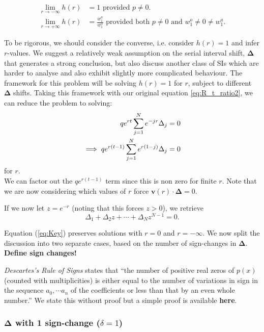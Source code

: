 \documentclass[10pt,journal,compsoc]{IEEEtran}
\begin{document}
\begin{align*}
    \lim_{r \rightarrow -\infty}h(r)&=1 \text{ provided }p \neq 0.\\
    \lim_{r \rightarrow +\infty}h(r)&=\frac{w_1^a}{w_1^o} \text{ provided both }p \neq 0 \text{ and }w_1^o \neq 0 \neq w_1^a.
\end{align*}

To be rigorous, we should consider the converse, i.e. consider $h(r) = 1$ and infer $r$-values. We suggest a relatively weak assumption on the serial interval shift, $\boldsymbol{\Delta}$ that generates a strong conclusion, but also discuss another class of SIs which are harder to analyse and also exhibit slightly more complicated behaviour. The framework for this problem will be solving $h(r) = 1$ for $r$, subject to different $\boldsymbol{\Delta}$ shifts. Taking this framework with our original equation \ref{eq:R_t_ratio2}, we can reduce the problem to solving: 
\begin{align}
   qe^{rt}\sum_{j=1}^{N} e^{-jr}\Delta_j &= 0 \notag \\
   \implies qe^{r(t-1)}\sum_{j=1}^{N} e^{r(1-j)}\Delta_j &= 0 \label{eq:Key}
\end{align}
for $r$.\\
We can factor out the $qe^{r(t-1)}$ term since this is non zero for finite $r$. Note that we are now considering which values of $r$ force $\boldsymbol{v}(r) \cdot \boldsymbol{\Delta}=0$.

If we now let $z = e^{-r}$ (noting that this forces $z>0$), we retrieve
\begin{equation}\label{eq:Poly}
    \Delta_1 +\Delta_2 z + \cdots +\Delta_{N}z^{N-1} = 0.
\end{equation}



Equation (\ref{eq:Key}) preserves solutions with $r=0$ and $r=-\infty$. We now split the discussion into two separate cases, based on the number of sign-changes in $\boldsymbol{\Delta}$. \textbf{Define sign changes!}

\textit{Descartes's Rule of Signs} states that ``the number of positive real zeros of $p(x)$ (counted with multiplicities) is either equal to the number of variations in sign in the sequence $a_0, \cdots a_n$ of the coefficients or less than that by an even whole number.'' We state this without proof but a simple proof is available \textbf{here}.

\subsubsection*{$\boldsymbol{\Delta}$ with 1 sign-change ($\delta = 1$)}
\end{document}
